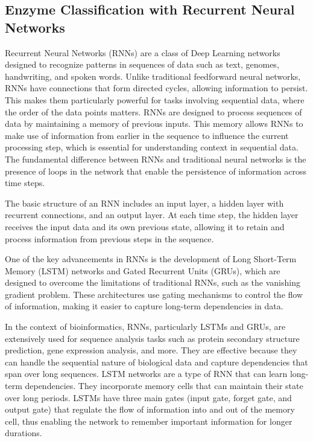 \subsection{Enzyme Classification with Recurrent Neural Networks}
\label{sec:Enzyme Classification with Recurrent Neural Networks}

Recurrent Neural Networks (RNNs) are a class of Deep Learning networks designed to recognize patterns in sequences of data such as text, genomes, handwriting, and spoken words. Unlike traditional feedforward neural networks, RNNs have connections that form directed cycles, allowing information to persist. This makes them particularly powerful for tasks involving sequential data, where the order of the data points matters. RNNs are designed to process sequences of data by maintaining a memory of previous inputs. This memory allows RNNs to make use of information from earlier in the sequence to influence the current processing step, which is essential for understanding context in sequential data. The fundamental difference between RNNs and traditional neural networks is the presence of loops in the network that enable the persistence of information across time steps. \autocite{schmidtRecurrentNeuralNetworks2019}

The basic structure of an RNN includes an input layer, a hidden layer with recurrent connections, and an output layer. At each time step, the hidden layer receives the input data and its own previous state, allowing it to retain and process information from previous steps in the sequence.

One of the key advancements in RNNs is the development of Long Short-Term Memory (LSTM) networks and Gated Recurrent Units (GRUs), which are designed to overcome the limitations of traditional RNNs, such as the vanishing gradient problem. These architectures use gating mechanisms to control the flow of information, making it easier to capture long-term dependencies in data.

In the context of bioinformatics, RNNs, particularly LSTMs and GRUs, are extensively used for sequence analysis tasks such as protein secondary structure prediction, gene expression analysis, and more. They are effective because they can handle the sequential nature of biological data and capture dependencies that span over long sequences. LSTM networks are a type of RNN that can learn long-term dependencies. They incorporate memory cells that can maintain their state over long periods. LSTMs have three main gates (input gate, forget gate, and output gate) that regulate the flow of information into and out of the memory cell, thus enabling the network to remember important information for longer durations. \autocite{hochreiterLongShortTermMemory1997}


